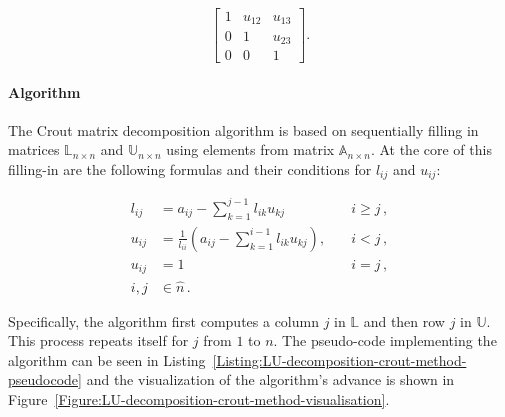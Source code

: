 \begin{equation}
	\begin{bmatrix}
		1      & u_{12} & u_{13} \\
		0      & 1      & u_{23} \\
		0      & 0      & 1
	\end{bmatrix}.
\end{equation}

\paragraph{Algorithm}
The Crout matrix decomposition algorithm is based on sequentially filling in matrices $ \mathbb{L}_{n\times n} $ and $ \mathbb{U}_{n\times n} $ using elements from matrix $ \mathbb{A}_{n\times n} $. At the core of this filling-in are the following formulas and their conditions for $ l_{ij} $ and $ u_{ij} $:

\begin{align}
	l_{ij} &= a_{ij} - \sum_{k=1}^{j-1}l_{ik}u_{kj} 								   &\quad i \geq j\,, \label{Equation:LU-decomposition-crout-method-lij} \\
	u_{ij} &= \frac{1}{l_{ii}} \left ( a_{ij} - \sum_{k=1}^{i-1}l_{ik}u_{kj} \right ), &\quad i < j\,, \\ \label{Equation:LU-decomposition-crout-method-uij}
	u_{ij} &= 1 																	   &\quad i = j\,, \\
	i,j &\in \widehat{n} \nonumber\,.
\end{align}

Specifically, the algorithm first computes a column $ j $ in $ \mathbb{L} $ and then row $ j $ in $ \mathbb{U} $. This process repeats itself for $ j $ from $ 1 $ to $ n $. The pseudo-code implementing the algorithm can be seen in Listing~\ref{Listing:LU-decomposition-crout-method-pseudocode} and the visualization of the algorithm's advance is shown in Figure~\ref{Figure:LU-decomposition-crout-method-visualisation}.

